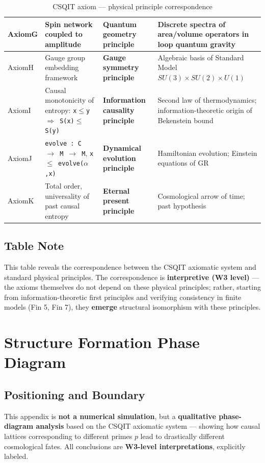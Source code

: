 \documentclass[aps,prd,twocolumn,nofootinbib,floatfix]{revtex4-2}
\begin{document}
\begin{table}[h]
\begin{tabular}{|p{1.5cm}|p{3.5cm}|p{3.5cm}|p{4cm}|}
\hline
AxiomG & Spin network coupled to amplitude & \textbf{Quantum geometry principle} & Discrete spectra of area/volume operators in loop quantum gravity \\
\hline
AxiomH & Gauge group embedding framework & \textbf{Gauge symmetry principle} & Algebraic basis of Standard Model $SU(3)\times SU(2)\times U(1)$ \\
\hline
AxiomI & Causal monotonicity of entropy: \texttt{x$\leq$y $\Rightarrow$ S(x)$\leq$S(y)} & \textbf{Information causality principle} & Second law of thermodynamics; information-theoretic origin of Bekenstein bound \\
\hline
AxiomJ & \texttt{evolve : C $\to$ M $\to$ M}, \texttt{x $\leq$ evolve($\alpha$,x)} & \textbf{Dynamical evolution principle} & Hamiltonian evolution; Einstein equations of GR \\
\hline
AxiomK & Total order, universality of past causal entropy & \textbf{Eternal present principle} & Cosmological arrow of time; past hypothesis \\
\hline
\end{tabular}
\caption{CSQIT axiom --- physical principle correspondence}
\end{table}

\subsection{Table Note}

This table reveals the correspondence between the CSQIT axiomatic system and standard physical principles. The correspondence is \textbf{interpretive (W3 level)} --- the axioms themselves do not depend on these physical principles; rather, starting from information-theoretic first principles and verifying consistency in finite models (Fin 5, Fin 7), they \textbf{emerge} structural isomorphism with these principles.

\section{Structure Formation Phase Diagram}

\subsection{Positioning and Boundary}

This appendix is \textbf{not a numerical simulation}, but a \textbf{qualitative phase-diagram analysis} based on the CSQIT axiomatic system --- showing how causal lattices corresponding to different primes $p$ lead to drastically different cosmological fates. All conclusions are \textbf{W3-level interpretations}, explicitly labeled.
\end{document}
